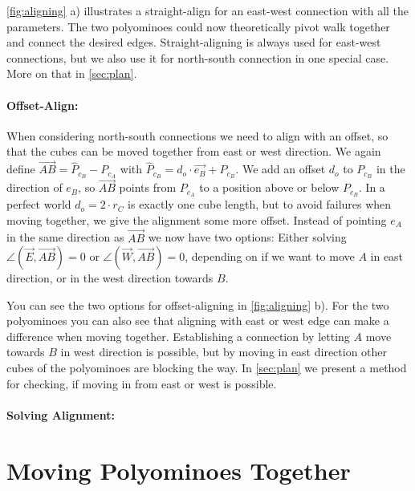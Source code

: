 \autoref{fig:aligning} a) illustrates a straight-align for an east-west connection with all the parameters.
The two polyominoes could now theoretically pivot walk together and connect the desired edges.
Straight-aligning is always used for east-west connections, but we also use it for north-south connection in one special case. More on that in \autoref{sec:plan}.

\paragraph{Offset-Align:}

When considering north-south connections we need to align with an offset, so that the cubes can be moved together from east or west direction.
We again define $\overrightarrow{AB} = \hat{P}_{c_B} - P_{c_A}$ with $\hat{P}_{c_B} = d_o \cdot \vec{e_B} + P_{c_B}$.
We add an offset $d_o$ to $P_{c_B}$ in the direction of $e_B$, so $\overrightarrow{AB}$ points from $P_{c_A}$ to a position above or below $P_{c_B}$.
In a perfect world $d_o = 2 \cdot r_C$ is exactly one cube length, but to avoid failures when moving together, we give the alignment some more offset.
Instead of pointing $e_A$ in the same direction as $\overrightarrow{AB}$ we now have two options:
Either solving $\angle \left( \vec{E}, \overrightarrow{AB} \right) = 0$ or $\angle \left( \vec{W}, \overrightarrow{AB} \right) = 0$, depending on if we want to move $A$ in east direction, or in the west direction towards $B$.

You can see the two options for offset-aligning in \autoref{fig:aligning} b).
For the two polyominoes you can also see that aligning with east or west edge can make a difference when moving together.
Establishing a connection by letting $A$ move towards $B$ in west direction is possible, but by moving in east direction other cubes of the polyominoes are blocking the way.
In \autoref{sec:plan} we present a method for checking, if moving in from east or west is possible. 

\paragraph{Solving Alignment:}



\section{Moving Polyominoes Together}
\label{sec:walk_wait}

